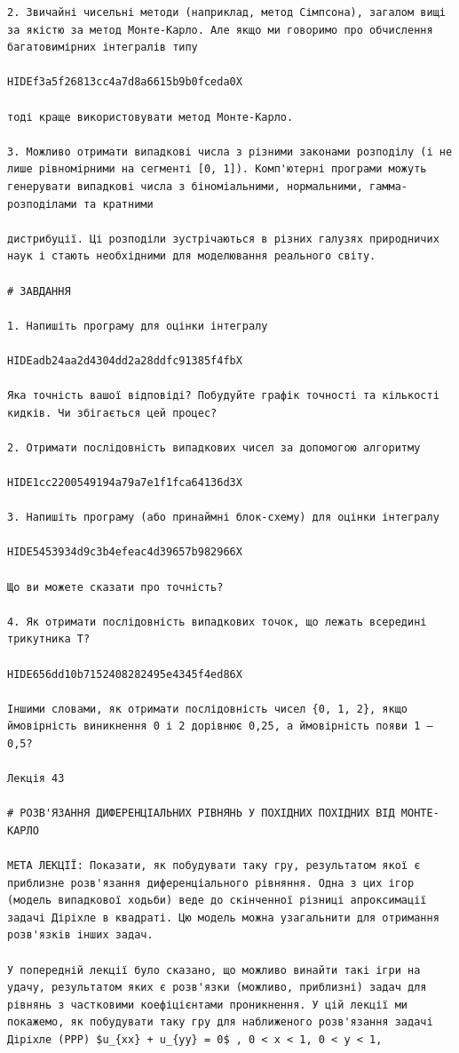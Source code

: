 \documentclass[
  ukrainian,
]{article}
\begin{document}
\begin{verbatim}
2. Звичайні чисельні методи (наприклад, метод Сімпсона), загалом вищі за якістю за метод Монте-Карло. Але якщо ми говоримо про обчислення багатовимірних інтегралів типу

HIDEf3a5f26813cc4a7d8a6615b9b0fceda0X

тоді краще використовувати метод Монте-Карло.

3. Можливо отримати випадкові числа з різними законами розподілу (і не лише рівномірними на сегменті [0, 1]). Комп'ютерні програми можуть генерувати випадкові числа з біноміальними, нормальними, гамма-розподілами та кратними

дистрибуції. Ці розподіли зустрічаються в різних галузях природничих наук і стають необхідними для моделювання реального світу.

# ЗАВДАННЯ

1. Напишіть програму для оцінки інтегралу

HIDEadb24aa2d4304dd2a28ddfc91385f4fbX

Яка точність вашої відповіді? Побудуйте графік точності та кількості кидків. Чи збігається цей процес?

2. Отримати послідовність випадкових чисел за допомогою алгоритму

HIDE1cc2200549194a79a7e1f1fca64136d3X

3. Напишіть програму (або принаймні блок-схему) для оцінки інтегралу

HIDE5453934d9c3b4efeac4d39657b982966X

Що ви можете сказати про точність?

4. Як отримати послідовність випадкових точок, що лежать всередині трикутника T?

HIDE656dd10b7152408282495e4345f4ed86X

Іншими словами, як отримати послідовність чисел {0, 1, 2}, якщо ймовірність виникнення 0 і 2 дорівнює 0,25, а ймовірність появи 1 — 0,5?

Лекція 43

# РОЗВ'ЯЗАННЯ ДИФЕРЕНЦІАЛЬНИХ РІВНЯНЬ У ПОХІДНИХ ПОХІДНИХ ВІД МОНТЕ-КАРЛО

МЕТА ЛЕКЦІЇ: Показати, як побудувати таку гру, результатом якої є приблизне розв'язання диференціального рівняння. Одна з цих ігор (модель випадкової ходьби) веде до скінченної різниці апроксимації задачі Діріхле в квадраті. Цю модель можна узагальнити для отримання розв'язків інших задач.

У попередній лекції було сказано, що можливо винайти такі ігри на удачу, результатом яких є розв'язки (можливо, приблизні) задач для рівнянь з частковими коефіцієнтами проникнення. У цій лекції ми покажемо, як побудувати таку гру для наближеного розв'язання задачі Діріхле (PPP) $u_{xx} + u_{yy} = 0$ , 0 < x < 1, 0 < y < 1,


\end{verbatim}
\end{document}
